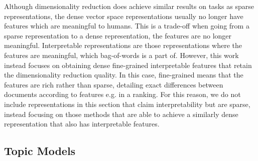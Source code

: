Although dimensionality reduction does achieve similar results on tasks as sparse representations, the dense vector space representations usually no longer have features which are meaningful to humans. This is a trade-off when going from a sparse representation to a dense representation, the features are no longer meaningful. Interpretable representations are those representations where the features are meaningful, which bag-of-words is a part of. However, this work instead focuses on obtaining dense fine-grained interpretable features that retain the dimensionality reduction quality. In this case, fine-grained means that the features are rich rather than sparse, detailing exact differences between documents according to features e.g. in a ranking. For this reason, we do not include representations in this section that claim interpretability but are sparse, instead focusing on those methods that are able to achieve a similarly dense representation that also has interpretable features.

\subsection{Topic Models}\label{bg:TopicModels}










